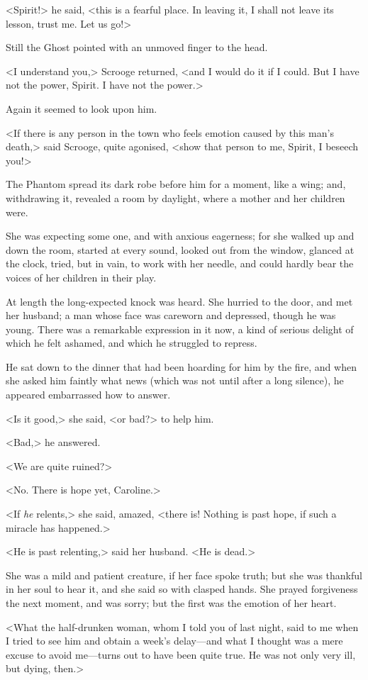 <Spirit!> he said, <this is a fearful place. In leaving it, I shall not leave
its lesson, trust me. Let us go!>

Still the Ghost pointed with an unmoved finger to the head.

<I understand you,> Scrooge returned, <and I would do it if I could. But I have
not the power, Spirit. I have not the power.>

Again it seemed to look upon him.

<If there is any person in the town who feels emotion caused by this man's
death,> said Scrooge, quite agonised, <show that person to me, Spirit, I beseech
you!>

The Phantom spread its dark robe before him for a moment, like a wing; and,
withdrawing it, revealed a room by daylight, where a mother and her children
were.

She was expecting some one, and with anxious eagerness; for she walked up and
down the room, started at every sound, looked out from the window, glanced at
the clock, tried, but in vain, to work with her needle, and could hardly bear
the voices of her children in their play.

At length the long-expected knock was heard. She hurried to the door, and met
her husband; a man whose face was careworn and depressed, though he was young.
There was a remarkable expression in it now, a kind of serious delight of which
he felt ashamed, and which he struggled to repress.

He sat down to the dinner that had been hoarding for him by the fire, and when
she asked him faintly what news (which was not until after a long silence), he
appeared embarrassed how to answer.

<Is it good,> she said, <or bad?> to help him.

<Bad,> he answered.

<We are quite ruined?>

<No. There is hope yet, Caroline.>

<If \emph{he} relents,> she said, amazed, <there is! Nothing is past hope, if
such a miracle has happened.>

<He is past relenting,> said her husband. <He is dead.>

She was a mild and patient creature, if her face spoke truth; but she was
thankful in her soul to hear it, and she said so with clasped hands. She prayed
forgiveness the next moment, and was sorry; but the first was the emotion of her
heart.

<What the half-drunken woman, whom I told you of last night, said to me when I
tried to see him and obtain a week's delay—and what I thought was a mere excuse
to avoid me—turns out to have been quite true. He was not only very ill, but
dying, then.>

